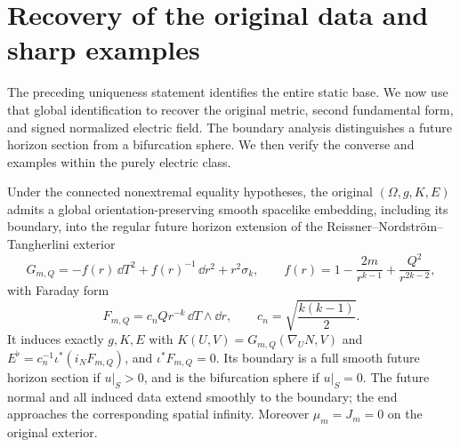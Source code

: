 \section{Recovery of the original data and sharp examples}
\label{rec:section}

The preceding uniqueness statement identifies the entire static
base. We now use that global identification to recover the original
metric, second fundamental form, and signed normalized electric
field. The boundary analysis distinguishes a future horizon section
from a bifurcation sphere. We then verify the converse and examples
within the purely electric class.

\begin{proposition}
\label{rec:original-embedding}
Under the connected nonextremal equality hypotheses, the original
$(\Omega,g,K,E)$ admits a global orientation-preserving smooth
spacelike embedding, including its boundary, into the regular future
horizon extension of the Reissner--Nordstr\"om--Tangherlini exterior
\begin{equation}\label{rec:model}
 G_{m,Q}=-f(r)\,\dd T^2+f(r)^{-1}\,\dd r^2+r^2\sigma_k,
 \qquad
 f(r)=1-\frac{2m}{r^{k-1}}+\frac{Q^2}{r^{2k-2}},
\end{equation}
with Faraday form
\begin{equation}\label{rec:faraday}
 F_{m,Q}=c_n Qr^{-k}\,\dd T\wedge\dd r,
 \qquad c_n=\sqrt{\frac{k(k-1)}2}.
\end{equation}
It induces exactly $g,K,E$ with
$K(U,V)=G_{m,Q}(\nabla_U N,V)$ and
$E^\flat=c_n^{-1}\iota^*(i_NF_{m,Q})$, and
$\iota^*F_{m,Q}=0$. Its boundary is a full smooth future horizon
section if $u|_S>0$, and is the bifurcation sphere if $u|_S=0$.
The future normal and all induced data extend smoothly to the
boundary; the end approaches the corresponding spatial infinity.
Moreover $\mu_m=J_m=0$ on the original exterior.
\end{proposition}

